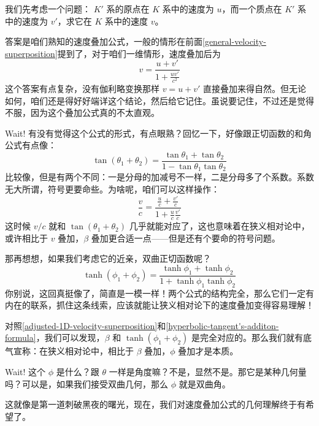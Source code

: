 \documentclass[12pt, a4paper, oneside]{ctexbook}
\begin{document}
我们先考虑一个问题：
$K'$ 系的原点在 $K$ 系中的速度为 $u$，而一个质点在 $K'$ 系中的速度为 $v'$，求它在 $K$ 系中的速度 $v$。\par   
答案是咱们熟知的速度叠加公式，一般的情形在前面\eqref{general-velocity-superposition}提到了，对于咱们一维情形，速度叠加后为
\begin{equation}
	v=\frac{u+v'}{1+\frac{uv'}{c^{2}}}
\end{equation}
这个答案有点复杂，没有伽利略变换那样 $v=u+v'$ 直接叠加来得自然。但无论如何，咱们还是得好好端详这个结论，然后给它记住。虽说要记住，不过还是觉得不服，因为这个叠加公式真的不太直观。\par   
Wait! 有没有觉得这个公式的形式，有点眼熟？回忆一下，好像跟正切函数的和角公式有点像：
\begin{equation}
	\tan(\theta_{1}+\theta_{2})=\frac{\tan\theta_{1}+\tan\theta_{2}}{1-\tan\theta_{1}\tan\theta_{2}}
\end{equation}
比较像，但是有两个不同：一是分母的加减号不一样，二是分母多了个系数。系数无大所谓，符号更要命些。为啥呢，咱们可以这样操作：
\begin{equation}\label{adjusted-1D-velocity-superposition}
	\frac{v}{c}=\frac{\frac{u}{c}+\frac{v'}{c}}{1+\frac{u}{c}\frac{v'}{c}}
\end{equation}
这时候 $v/c$ 就和 $\tan(\theta_{1}+\theta_{2})$ 几乎就能对应了，这也意味着在狭义相对论中，或许相比于 $v$ 叠加，$\beta$ 叠加更合适一点——但是还有个要命的符号问题。 \par 
那再想想，如果我们考虑它的近亲，双曲正切函数呢？
\begin{equation}\label{hyperbolic-tangent's-additon-formula}
	\tanh(\phi_{1}+\phi_{2})=\frac{\tanh\phi_{1}+\tanh\phi_{2}}{1+\tanh\phi_{1}\tanh\phi_{2}}
\end{equation}
你别说，这回真挺像了，简直是一模一样！两个公式的结构完全，那么它们一定有内在的联系，抓住这条线索，应该就能让狭义相对论下的速度叠加变得容易理解！\par   
对照\eqref{adjusted-1D-velocity-superposition}和\eqref{hyperbolic-tangent's-additon-formula}，我们可以发现，$\beta$ 和 $\tanh(\phi_{1}+\phi_{2})$ 是完全对应的。那么我们就有底气宣称：在狭义相对论中，相比于 $\beta$ 叠加，$\phi$ 叠加才是本质。\par   
Wait! 这个 $\phi$ 是什么？跟 $\theta$ 一样是角度嘛？不是，显然不是。那它是某种几何量吗？可以是，如果我们接受双曲几何，那么 $\phi$ 就是双曲角。\par   
这就像是第一道刺破黑夜的曙光，现在，我们对速度叠加公式的几何理解终于有希望了。
\end{document}
